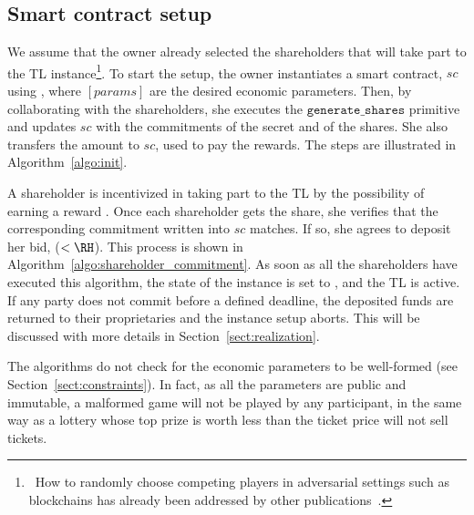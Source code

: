 \subsection{Smart contract setup}\label{sect:sc_init}

We assume that the owner already selected the shareholders that will take part to the TL instance\footnote{\ How to randomly choose competing players in adversarial settings such as blockchains has already been addressed by other publications~\cite{dong2017betrayal,10.1007/978-3-030-01177-2_81}.}.
To start the setup, the owner instantiates a smart contract, $sc$ using \priminit{[params]}, where $[params]$ are the desired economic parameters.
Then, by collaborating with the shareholders, she executes the $\texttt{generate\_shares}$ primitive and updates $sc$ with the commitments of the secret and of the shares.
She also transfers the amount \PO to $sc$, used to pay the rewards.
The steps are illustrated in Algorithm~\ref{algo:init}.

A shareholder \shareholder is incentivized in taking part to the TL by the possibility of earning a reward \RH.
Once each shareholder gets the share, she verifies that the corresponding commitment written into $sc$ matches. 
If so, she agrees to deposit her bid, \BH ($<\RH$). 
This process is shown in Algorithm~\ref{algo:shareholder_commitment}.
%
As soon as all the shareholders have executed this algorithm, the state of the instance is set to \statelocked, and the TL is active. 
If any party does not commit before a defined deadline, the deposited funds are returned to their proprietaries and the instance setup aborts. This will be discussed with more details in Section~\ref{sect:realization}.

The algorithms do not check for the economic parameters to be well-formed (see Section~\ref{sect:constraints}). 
In fact, as all the parameters are public and immutable, a malformed game will not be played by any participant, in the same way as a lottery whose top prize is worth less than the ticket price will not sell tickets.


